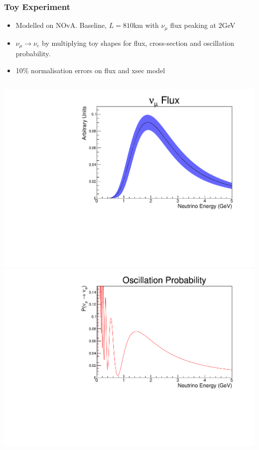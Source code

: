 \documentclass[9pt, aspectratio=169]{beamer}
\begin{document}
\begin{frame}
  \frametitle{Toy Experiment}
  \begin{itemize}
    \item Modelled on NOvA. Baseline, $L = 810$km with $\nu_{\mu}$ flux peaking at $2$GeV
    \item $\nu_{\mu} \rightarrow \nu_{e}$ by multiplying toy shapes for flux, cross-section and oscillation probability.
    \item 10\% normalisation errors on flux and xsec model
  \end{itemize}
  \bigskip
  \begin{columns}
    \includegraphics[scale=0.185]{figures_final/flux.pdf}
    \hfill *
    \includegraphics[scale=0.185]{figures_final/osc.pdf}

\end{columns}
\end{frame}
\end{document}
